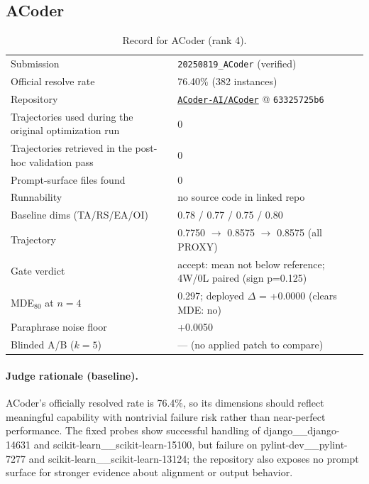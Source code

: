 \subsection{ACoder}
\label{app:agent4}
\begin{table}[H]\centering\scriptsize
\caption{Record for ACoder (rank 4).}
\begin{tabular}{lp{8.2cm}}\toprule
Submission & \texttt{20250819\_\allowbreak{}ACoder} (verified) \\
Official resolve rate & 76.40\% (382 instances) \\
Repository & \href{https://github.com/ACoder-AI/ACoder}{\texttt{ACoder-AI/ACoder}} @ \texttt{63325725b6} \\
Trajectories used during the original optimization run & 0 \\
Trajectories retrieved in the post-hoc validation pass & 0 \\
Prompt-surface files found & 0 \\
Runnability & no source code in linked repo \\
Baseline dims (TA/RS/EA/OI) & 0.78 / 0.77 / 0.75 / 0.80 \\
Trajectory & 0.7750 $\to$ 0.8575 $\to$ 0.8575 (all PROXY) \\
Gate verdict & accept: mean not below reference; 4W/0L paired (sign p=0.125) \\
MDE$_{80}$ at $n{=}4$ & 0.297; deployed $\Delta$ = +0.0000 (clears MDE: no) \\
Paraphrase noise floor & +0.0050 \\
Blinded A/B ($k{=}5$) & --- (no applied patch to compare) \\
\bottomrule\end{tabular}\end{table}
\paragraph{Judge rationale (baseline).}
ACoder's officially resolved rate is 76.4\%, so its dimensions should reflect meaningful capability with nontrivial failure risk rather than near-perfect performance. The fixed probes show successful handling of django\_\_django-14631 and scikit-learn\_\_scikit-learn-15100, but failure on pylint-dev\_\_pylint-7277 and scikit-learn\_\_scikit-learn-13124; the repository also exposes no prompt surface for stronger evidence about alignment or output behavior.
